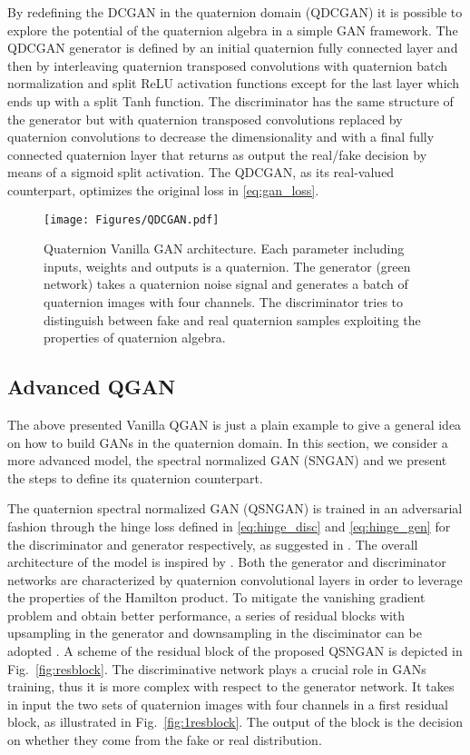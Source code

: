 \documentclass[graybox]{svmult}
\begin{document}
By redefining the DCGAN in the quaternion domain (QDCGAN) it is possible to explore the potential of the quaternion algebra in a simple GAN framework. The QDCGAN generator is defined by an initial quaternion fully connected layer and then by interleaving quaternion transposed convolutions with quaternion batch normalization and split ReLU activation functions except for the last layer which ends up with a split Tanh function. The discriminator has the same structure of the generator but with quaternion transposed convolutions replaced by quaternion convolutions to decrease the dimensionality and with a final fully connected quaternion layer that returns as output the real/fake decision by means of a sigmoid split activation. The QDCGAN, as its real-valued counterpart, optimizes the original loss in \eqref{eq:gan_loss}.


\begin{figure}
    \centering
    \texttt{[image: Figures/QDCGAN.pdf]}
    \caption{Quaternion Vanilla GAN architecture. Each parameter including inputs, weights and outputs is a quaternion. The generator (green network) takes a quaternion noise signal and generates a batch of quaternion images with four channels. The discriminator tries to distinguish between fake and real quaternion samples exploiting the properties of quaternion algebra.}
    \label{fig:qdcgan}
\end{figure}


\subsection{Advanced QGAN}
\label{sec:adv_qgan}

The above presented Vanilla QGAN is just a plain example to give a general idea on how to build GANs in the quaternion domain. In this section, we consider a more advanced model, the spectral normalized GAN (SNGAN) \cite{Miyato2018SpectralNF} and we present the steps to define its quaternion counterpart.

The quaternion spectral normalized GAN (QSNGAN) is trained in an adversarial fashion through the hinge loss defined in \eqref{eq:hinge_disc} and \eqref{eq:hinge_gen} for the discriminator and generator respectively, as suggested in \cite{Miyato2018SpectralNF, Chen2019SelfSupervisedGV}. The overall architecture of the model is inspired by \cite{Chen2019SelfSupervisedGV}. Both the generator and discriminator networks are characterized by quaternion convolutional layers in order to leverage the properties of the Hamilton product. To mitigate the vanishing gradient problem and obtain better performance, a series of residual blocks with upsampling in the generator and downsampling in the disciminator can be adopted \cite{Miyato2018SpectralNF}. A scheme of the residual block of the proposed QSNGAN is depicted in Fig.~\ref{fig:resblock}. The discriminative network plays a crucial role in GANs training, thus it is more complex with respect to the generator network. It takes in input the two sets of quaternion images with four channels in a first residual block, as illustrated in Fig.~\ref{fig:1resblock}. The output of the block is the decision on whether they come from the fake or real distribution. 
\end{document}
